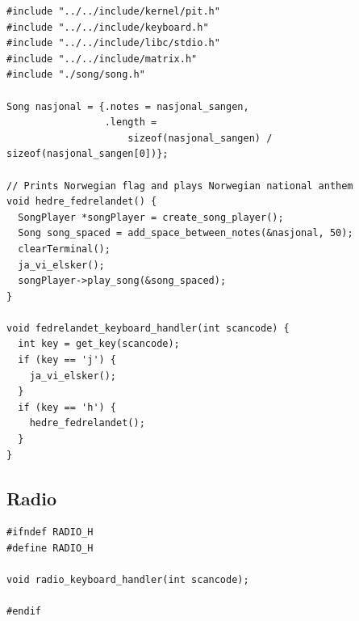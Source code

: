 \documentclass[../main.tex]{subfiles}
\begin{document}
\label{lst:fedrelandet_c}
\begin{verbatim}
#include "../../include/kernel/pit.h"
#include "../../include/keyboard.h"
#include "../../include/libc/stdio.h"
#include "../../include/matrix.h"
#include "./song/song.h"

Song nasjonal = {.notes = nasjonal_sangen,
                 .length =
                     sizeof(nasjonal_sangen) / sizeof(nasjonal_sangen[0])};

// Prints Norwegian flag and plays Norwegian national anthem
void hedre_fedrelandet() {
  SongPlayer *songPlayer = create_song_player();
  Song song_spaced = add_space_between_notes(&nasjonal, 50);
  clearTerminal();
  ja_vi_elsker();
  songPlayer->play_song(&song_spaced);
}

void fedrelandet_keyboard_handler(int scancode) {
  int key = get_key(scancode);
  if (key == 'j') {
    ja_vi_elsker();
  }
  if (key == 'h') {
    hedre_fedrelandet();
  }
}

\end{verbatim}


\subsection{Radio}
\label{apx:radio}


\label{lst:radio_h}
\begin{verbatim}
#ifndef RADIO_H
#define RADIO_H

void radio_keyboard_handler(int scancode);

#endif

\end{verbatim}
\end{document}
